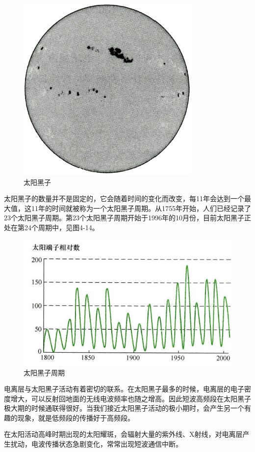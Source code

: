 \documentclass[12pt,UTF8]{ctexbook}
\begin{document}
\begin{figure}[htbp]
	\centering
	\includegraphics[width=0.7\linewidth]{56}
	\caption{太阳黑子}
	\label{fig:1}
\end{figure}

太阳黑子的数量并不是固定的，它会随着时间的变化而改变，每11年会达到一个最大值，这11年的时间就被称为一个太阳黑子周期。从1755年开始，人们已经记录了23个太阳黑子周期。第23个太阳黑子周期开始于1996年的10月份，目前太阳黑子正处在第24个周期中，见图4-14。

\begin{figure}[htbp]
	\centering
	\includegraphics[width=0.7\linewidth]{57}
	\caption{太阳黑子周期}
	\label{fig:1}
\end{figure}

电离层与太阳黑子活动有着密切的联系。在太阳黑子最多的时候，电离层的电子密度增大，可以反射回地面的无线电波频率也随之增高。因此短波高频段在太阳黑子极大期的时候通联得很好。当我们接近太阳黑子活动的极小期时，会产生另一个有趣的现象，就是低频段的传播好于高频段。

在太阳活动高峰时期出现的太阳耀斑，会辐射大量的紫外线、X射线，对电离层产生扰动，电波传播状态急剧变化，常常出现短波通信中断。
\end{document}
